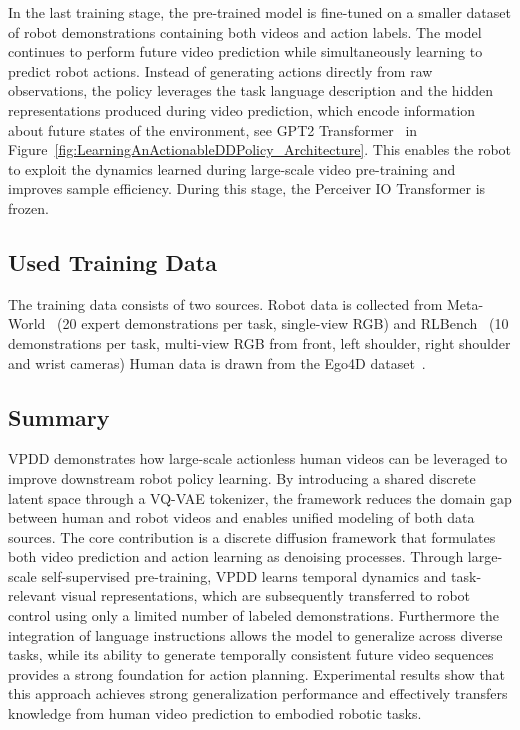 \begin{enumerate}
    In the last training stage, the pre-trained model is fine-tuned on a smaller dataset of robot demonstrations containing both videos and action labels. The model continues to perform future video prediction while simultaneously learning to predict robot actions. Instead of generating actions directly from raw observations, the policy leverages the task language description and the hidden representations produced during video prediction, which encode information about future states of the environment, see GPT2 Transformer~\cite{Radford2019LanguageMA} in Figure~\ref{fig:LearningAnActionableDDPolicy_Architecture}. This enables the robot to exploit the dynamics learned during large-scale video pre-training and improves sample efficiency. During this stage, the Perceiver IO Transformer is frozen. 
\end{enumerate}





\subsection{Used Training Data}
The training data consists of two sources. 
Robot data is collected from Meta-World~\cite{Yu2019MetaWorldAB} (20 expert demonstrations per task, single-view RGB) and RLBench~\cite{James2019RLBenchTR} (10 demonstrations per task, multi-view RGB from front, left shoulder, right shoulder and wrist cameras)
Human data is drawn from the Ego4D dataset~\cite{Grauman2021Ego4DAT}.


\subsection{Summary}
VPDD demonstrates how large-scale actionless human videos can be leveraged to improve downstream robot policy learning. By introducing a shared discrete latent space through a \ac{VQ-VAE} tokenizer, the framework reduces the domain gap between human and robot videos and enables unified modeling of both data sources. The core contribution is a discrete diffusion framework that formulates both video prediction and action learning as denoising processes. Through large-scale self-supervised pre-training, VPDD learns temporal dynamics and task-relevant visual representations, which are subsequently transferred to robot control using only a limited number of labeled demonstrations.
Furthermore the integration of language instructions allows the model to generalize across diverse tasks, while its ability to generate temporally consistent future video sequences provides a strong foundation for action planning. Experimental results show that this approach achieves strong generalization performance and effectively transfers knowledge from human video prediction to embodied robotic tasks.




